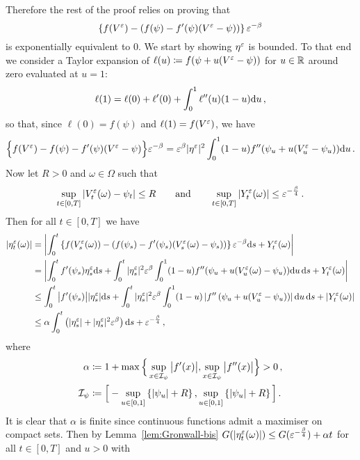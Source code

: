 Therefore the rest of the proof relies on proving that 
\[
\left\{f(V^\varepsilon) - \left(f(\psi) - f'(\psi)(V^\varepsilon -\psi)\right)\right\}\varepsilon^{-\beta}
\]
is exponentially equivalent to $0$. %
We start by showing $\eta^\varepsilon$ is bounded. To that end we consider a Taylor expansion of $\ell(u) \coloneqq f(\psi+u(V^\varepsilon - \psi))$ for $u\in\mathbb{R}$ around zero evaluated at $u=1$:
\[
\ell(1)=\ell(0)+\ell'(0) + \int_0^1 \ell''(u)(1-u)\mathrm{d} u\,,
\]
so that, since $\ell(0)=f(\psi)$ and $\ell(1)=f(V^\varepsilon)$, we have 
\[
\Big\{f(V^\varepsilon) - f(\psi) - f'(\psi)(V^\varepsilon -\psi)\Big\}\varepsilon^{-\beta}
= \varepsilon^\beta |\eta^\varepsilon|^2 \int_0^1 (1-u)f''(\psi_u + u (V^\varepsilon_u - \psi_u))\mathrm{d} u\,.
\]
Now let $R>0$ and $\omega \in \Omega$ such that 
\[
\sup_{t \in [0,T]}|V_t^\varepsilon(\omega) - \psi_t|\leq R
\qquad\text{and}\qquad 
\sup_{t \in [0,T]}|Y^\varepsilon_t(\omega)| \leq \varepsilon^{-\frac{\beta}{4}}\,.
\]
Then for all $t\in[0,T]$ we have
\begin{align*}
\left|\eta_{t}^\varepsilon(\omega)\right| &= \left\lvert \int_0^t\left\{f(V^\varepsilon_s(\omega)) - \left(f(\psi_s) - f'(\psi_s)(V_s^\varepsilon(\omega) -\psi_s)\right)\right\}\varepsilon^{-\beta}\mathrm{d} s + Y^{\varepsilon}_t(\omega)\right\rvert \\
&= \left\lvert\int_0^t f'(\psi_s)\eta_{s}^\varepsilon\mathrm{d} s + \int_0^t|\eta_{s}^\varepsilon|^2\varepsilon^{\beta} \int_0^1(1-u)f''(\psi_u + u(V^\varepsilon_u(\omega) - \psi_u))\mathrm{d} u\,\mathrm{d} s + Y_t^\varepsilon(\omega)\right\rvert \\
&\leq \int_0^t\big|f'(\psi_s)\big| |\eta_{s}^\varepsilon|\mathrm{d} s + \int_0^t|\eta_{s}^\varepsilon|^2\varepsilon^{\beta} \int_0^1(1-u)\left|f''\left(\psi_u + u(V^\varepsilon_u - \psi_u)\right)\right|\mathrm{d} u\,\mathrm{d} s + \left|Y_t^\varepsilon(\omega)\right|\\
&\leq \alpha \int_0^t\left(|\eta_{s}^\varepsilon| + |\eta_{s}^\varepsilon|^2\varepsilon^{\beta}\right) \mathrm{d} s + \varepsilon^{-\frac{\beta}{4}}\,,
\end{align*}
where
\begin{align*}
\alpha &\coloneqq 1+\max\Big\{\sup_{x \in \mathcal{I}_\psi}\big|f'(x)\big|, \sup_{x\in \mathcal{I}_\psi}\big|f''(x)\big| \Big\}>0\,, \\
\mathcal{I}_\psi &\coloneqq  \Big[-\sup_{u \in [0,1]}\left\{|\psi_u|+ R\right\},\sup_{u \in [0,1]}\left\{|\psi_u| + R\right\}\Big]\,.
\end{align*}
It is clear that $\alpha$ is finite since continuous functions admit a maximiser on compact sets. Then by Lemma~\ref{lem:Gronwall-bis} $G(|\eta_{t}^\varepsilon(\omega)|) \leq G(\varepsilon^{-\frac{\beta}{4}}) + \alpha t$ for all $t \in [0,T]$ and $u>0$ with 
